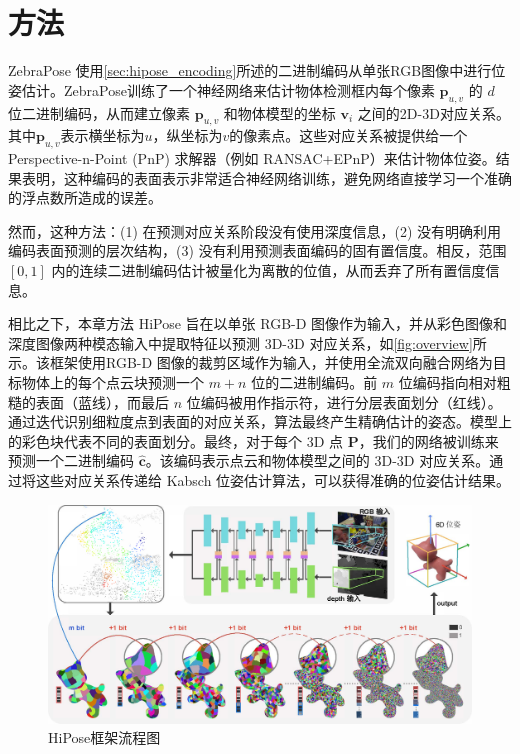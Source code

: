 \section{方法}

ZebraPose\cite{su2022zebrapose} 使用\autoref{sec:hipose_encoding}所述的二进制编码从单张RGB图像中进行位姿估计。ZebraPose训练了一个神经网络来估计物体检测框内每个像素 $\mathbf{p}_{u,v}$ 的 $d$ 位二进制编码，从而建立像素 $\mathbf{p}_{u,v}$ 和物体模型的坐标 $\mathbf{v}_{i}$ 之间的2D-3D对应关系。其中$\mathbf{p}_{u,v}$表示横坐标为$u$，纵坐标为$v$的像素点。这些对应关系被提供给一个Perspective-n-Point (PnP) 求解器（例如 RANSAC+EPnP\cite{EPnP}）来估计物体位姿。结果表明，这种编码的表面表示非常适合神经网络训练，避免网络直接学习一个准确的浮点数所造成的误差。

然而，这种方法：(1) 在预测对应关系阶段没有使用深度信息，(2) 没有明确利用编码表面预测的层次结构，(3) 没有利用预测表面编码的固有置信度。相反，范围 $[0,1]$ 内的连续二进制编码估计被量化为离散的位值，从而丢弃了所有置信度信息。

相比之下，本章方法 HiPose 旨在以单张 RGB-D 图像作为输入，并从彩色图像和深度图像两种模态输入中提取特征以预测 3D-3D 对应关系，如\autoref{fig:overview}所示。该框架使用RGB-D 图像的裁剪区域作为输入，并使用全流双向融合网络为目标物体上的每个点云块预测一个 $m+n$ 位的二进制编码。前 $m$ 位编码指向相对粗糙的表面（蓝线），而最后 $n$ 位编码被用作指示符，进行分层表面划分（红线）。通过迭代识别细粒度点到表面的对应关系，算法最终产生精确估计的姿态。模型上的彩色块代表不同的表面划分。最终，对于每个 3D 点 $\mathbf{P}$，我们的网络被训练来预测一个二进制编码 $\hat{\mathbf{c}}$。该编码表示点云和物体模型之间的 3D-3D 对应关系。通过将这些对应关系传递给 Kabsch 位姿估计算法\cite{umeyama1991least}，可以获得准确的位姿估计结果。

\begin{figure}[ht]
    \centering
    \includegraphics[width=\textwidth]{figure/hipose/overview.pdf}
    \caption{HiPose框架流程图}
    \label{fig:overview}
\end{figure}

